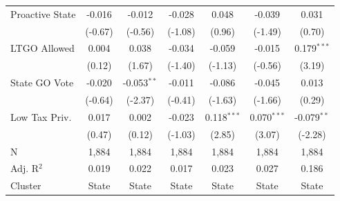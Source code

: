 \begin{tabular*}{\textwidth}{@{\extracolsep{\fill}}lcccccc}
   Proactive State           & -0.016        & -0.012        & -0.028        & 0.048         & -0.039         & 0.031\\   
                             & (-0.67)      & (-0.56)      & (-1.08)      & (0.96)       & (-1.49)       & (0.70)\\   
   LTGO Allowed              & 0.004         & 0.038         & -0.034        & -0.059        & -0.015         & 0.179$^{***}$\\   
                             & (0.12)       & (1.67)       & (-1.40)      & (-1.13)      & (-0.56)       & (3.19)\\   
   State GO Vote             & -0.020        & -0.053$^{**}$ & -0.011        & -0.086        & -0.045         & 0.013\\   
                             & (-0.64)      & (-2.37)      & (-0.41)      & (-1.63)      & (-1.66)       & (0.29)\\   
   Low Tax Priv.             & 0.017         & 0.002         & -0.023        & 0.118$^{***}$ & 0.070$^{***}$  & -0.079$^{**}$\\   
                             & (0.47)       & (0.12)       & (-1.03)      & (2.85)       & (3.07)        & (-2.28)\\   
   \hline
   N              & 1,884         & 1,884         & 1,884         & 1,884         & 1,884          & 1,884\\  
   Adj. R$^2$            & 0.019         & 0.022         & 0.017         & 0.023         & 0.027          & 0.186\\  
   Cluster              & State & State & State & State & State & State\\  
   \bottomrule
\end{tabular*}
\par\endgroup
